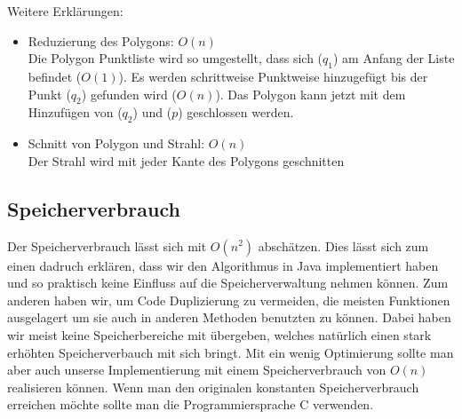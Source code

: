   Weitere Erklärungen:

  \begin{itemize}
  \item Reduzierung des Polygons: $O(n)$\\
        Die Polygon Punktliste wird so umgestellt, dass sich ($q_1$) am Anfang der
        Liste befindet ($O(1)$). Es werden schrittweise Punktweise hinzugefügt bis
        der Punkt ($q_2$) gefunden wird ($O(n)$). Das Polygon kann jetzt mit dem
        Hinzufügen von ($q_2$) und ($p$) geschlossen werden.
  \item Schnitt von Polygon und Strahl: $O(n)$\\
        Der Strahl wird mit jeder Kante des Polygons geschnitten
  \end{itemize}

  \subsection{Speicherverbrauch}

  Der Speicherverbrauch lässt sich mit $O(n^2)$ abschätzen. Dies lässt sich zum
  einen dadruch erklären, dass wir den Algorithmus in Java implementiert haben
  und so praktisch keine Einfluss auf die Speicherverwaltung nehmen können. Zum
  anderen haben wir, um Code Duplizierung zu vermeiden, die meisten Funktionen
  ausgelagert um sie auch in anderen Methoden benutzten zu können. Dabei haben wir
  meist keine Speicherbereiche mit übergeben, welches natürlich einen stark
  erhöhten Speicherverbauch mit sich bringt. Mit ein wenig Optimierung sollte man
  aber auch unserse Implementierung mit einem Speicherverbrauch von $O(n)$
  realisieren können. Wenn man den originalen konstanten Speicherverbrauch
  erreichen möchte sollte man die Programmiersprache C verwenden.






